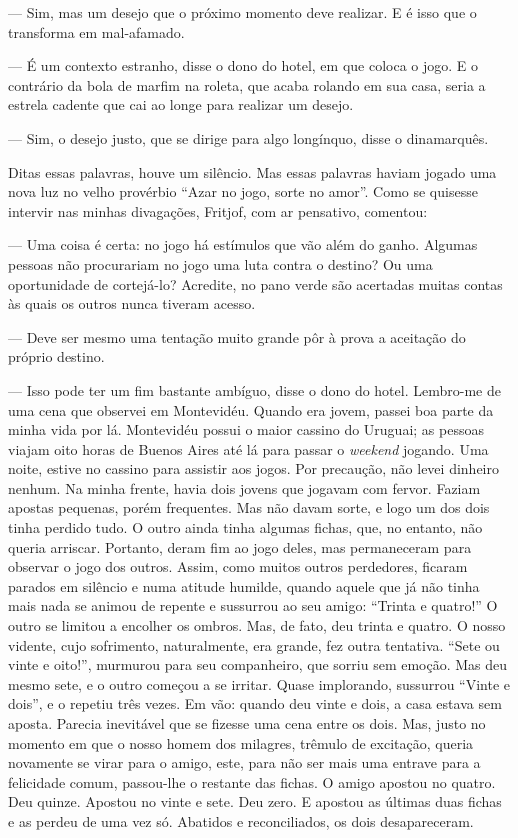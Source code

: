 --- Sim, mas um desejo que o próximo momento deve realizar. E é isso que
o transforma em mal-afamado.

--- É um contexto estranho, disse o dono do hotel, em que coloca o jogo.
E o contrário da bola de marfim na roleta, que acaba rolando em sua
casa, seria a estrela cadente que cai ao longe para realizar um desejo.

--- Sim, o desejo justo, que se dirige para algo longínquo, disse o
dinamarquês.

Ditas essas palavras, houve um silêncio. Mas essas palavras haviam
jogado uma nova luz no velho provérbio ``Azar no jogo, sorte no amor''.
Como se quisesse intervir nas minhas divagações, Fritjof, com ar
pensativo, comentou:

--- Uma coisa é certa: no jogo há estímulos que vão além do ganho.
Algumas pessoas não procurariam no jogo uma luta contra o destino? Ou
uma oportunidade de cortejá-lo? Acredite, no pano verde são acertadas
muitas contas às quais os outros nunca tiveram acesso.

--- Deve ser mesmo uma tentação muito grande pôr à prova a aceitação do
próprio destino.

--- Isso pode ter um fim bastante ambíguo, disse o dono do hotel.
Lembro-me de uma cena que observei em Montevidéu. Quando era jovem,
passei boa parte da minha vida por lá. Montevidéu possui o maior cassino
do Uruguai; as pessoas viajam oito horas de Buenos Aires até lá para
passar o \emph{weekend} jogando. Uma noite, estive no cassino para
assistir aos jogos. Por precaução, não levei dinheiro nenhum. Na minha
frente, havia dois jovens que jogavam com fervor. Faziam apostas
pequenas, porém frequentes. Mas não davam sorte, e logo um dos dois
tinha perdido tudo. O outro ainda tinha algumas fichas, que, no entanto,
não queria arriscar. Portanto, deram fim ao jogo deles, mas permaneceram
para observar o jogo dos outros. Assim, como muitos outros perdedores,
ficaram parados em silêncio e numa atitude humilde, quando aquele que já
não tinha mais nada se animou de repente e sussurrou ao seu amigo:
``Trinta e quatro!'' O outro se limitou a encolher os ombros. Mas, de
fato, deu trinta e quatro. O nosso vidente, cujo sofrimento,
naturalmente, era grande, fez outra tentativa. ``Sete ou vinte e
oito!'', murmurou para seu companheiro, que sorriu sem emoção. Mas deu
mesmo sete, e o outro começou a se irritar. Quase implorando, sussurrou
``Vinte e dois'', e o repetiu três vezes. Em vão: quando deu vinte e
dois, a casa estava sem aposta. Parecia inevitável que se fizesse uma
cena entre os dois. Mas, justo no momento em que o nosso homem dos
milagres, trêmulo de excitação, queria novamente se virar para o amigo,
este, para não ser mais uma entrave para a felicidade comum, passou-lhe
o restante das fichas. O amigo apostou no quatro. Deu quinze. Apostou no
vinte e sete. Deu zero. E apostou as últimas duas fichas e as perdeu de
uma vez só. Abatidos e reconciliados, os dois desapareceram.

